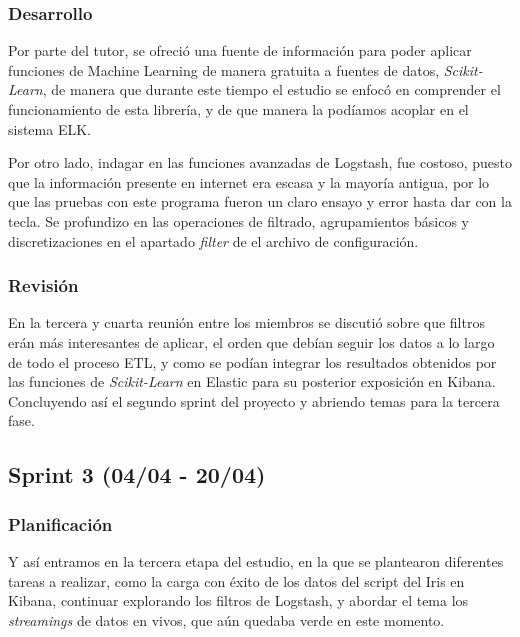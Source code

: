 \subsubsection{Desarrollo}
Por parte del tutor, se ofreció una fuente de información para poder aplicar funciones de Machine Learning de manera gratuita a fuentes de datos, \textit{Scikit-Learn}, de manera que durante este tiempo el estudio se enfocó en comprender el funcionamiento de esta librería, y de que manera la podíamos acoplar en el sistema ELK.

Por otro lado, indagar en las funciones avanzadas de Logstash, fue costoso, puesto que la información presente en internet era escasa y la mayoría antigua, por lo que las pruebas con este programa fueron un claro ensayo y error hasta dar con la tecla. Se profundizo en las operaciones de filtrado, agrupamientos básicos y discretizaciones en el apartado \textit{filter} de el archivo de configuración.

\subsubsection{Revisión}
En la tercera y cuarta reunión entre los miembros se discutió sobre que filtros erán más interesantes de aplicar, el orden que debían seguir los datos a lo largo de todo el proceso ETL, y como se podían integrar los resultados obtenidos por las funciones de \textit{Scikit-Learn} en Elastic para su posterior exposición en Kibana. Concluyendo así el segundo sprint del proyecto y abriendo temas para la tercera fase.

\paragraph{}
\paragraph{}
\paragraph{}


\subsection{Sprint 3 (04/04  - 20/04)}
\subsubsection{Planificación}
Y así entramos en la tercera etapa del estudio, en la que se plantearon diferentes tareas a realizar, como la carga con éxito de los datos del script del Iris en Kibana, continuar explorando los filtros de Logstash, y abordar el tema los \textit{streamings} de datos en vivos, que aún quedaba verde en este momento.


